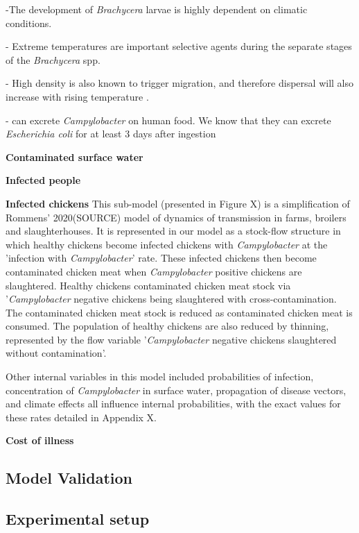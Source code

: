 -The development of \textit{Brachycera} larvae is highly dependent on climatic conditions. 

- Extreme temperatures are important selective agents during the separate stages of the \textit{Brachycera} spp.

- High density is also known to trigger migration, and therefore dispersal will also increase with rising temperature \parencite{feder_locomotion_2010}.

-  can excrete \textit{Campylobacter} on human food. We know that they can excrete \textit{Escherichia coli} for at least 3 days after ingestion

\textbf{Contaminated surface water}

\textbf{Infected people}

\textbf{Infected chickens}
This sub-model (presented in Figure X) is a simplification of Rommens' 2020(SOURCE) model of dynamics of transmission in farms, broilers and slaughterhouses. It is represented in our model as a stock-flow structure in which healthy chickens become infected chickens with \textit{Campylobacter} at the 'infection with \textit{Campylobacter}' rate. These infected chickens then become contaminated chicken meat when \textit{Campylobacter} positive chickens are slaughtered. Healthy chickens  contaminated chicken meat stock via '\textit{Campylobacter} negative chickens being slaughtered with cross-contamination. The contaminated chicken meat stock is reduced as contaminated chicken meat is consumed. The population of healthy chickens are also reduced by thinning, represented by the flow variable '\textit{Campylobacter} negative chickens slaughtered without contamination'.

Other internal variables in this model included probabilities of infection, concentration of \textit{Campylobacter} in surface water, propagation of disease vectors, and climate effects all influence internal probabilities, with the exact values for these rates detailed in Appendix X.


\textbf{Cost of illness}

\subsection{Model Validation}
    
\subsection{Experimental setup}



